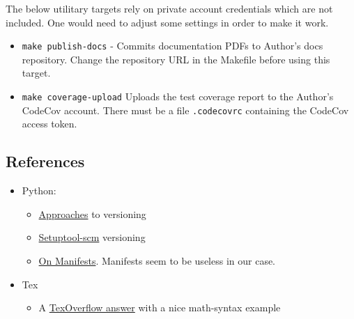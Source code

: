 \begin{itemize}
    The below utilitary targets rely on private account credentials which are
    not included. One would need to adjust some settings in order to make it
    work.

    \begin{itemize}

      \item \texttt{make publish-docs} - Commits documentation PDFs to
        Author's docs repository. Change the repository URL in the Makefile
        before using this target.

      \item \texttt{make coverage-upload} Uploads the test coverage report to
        the Author's CodeCov account. There must be a file \texttt{.codecovrc}
        containing the CodeCov access token.

    \end{itemize}

\end{itemize}


\subsection{References}

\begin{itemize}
  \item Python:
    \begin{itemize}
      \item
        \href{https://packaging.python.org/guides/single-sourcing-package-version/}{Approaches}
        to versioning
      \item
        \href{https://pypi.org/project/setuptools-scm/}{Setuptool-scm} versioning
      \item
        \href{https://docs.python.org/3.7/distutils/sourcedist.html#manifest-template}{On Manifests}. Manifests seem to be useless in our case.
    \end{itemize}

  \item Tex
    \begin{itemize}
      \item A
        \href{https://tex.stackexchange.com/questions/209863/how-to-add-mathematical-notation-of-a-set}{TexOverflow answer}
        with a nice math-syntax example
    \end{itemize}
\end{itemize}



